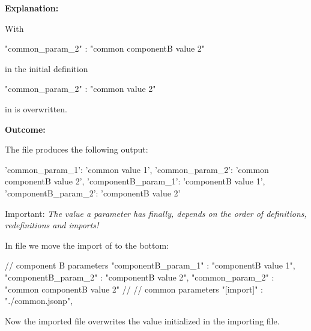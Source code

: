 \newpage

\textbf{Explanation:}

\vspace{2ex}

With

\begin{pythoncode}
   "common_param_2" : "common componentB value 2"
\end{pythoncode}

in  the initial definition

\begin{pythoncode}
   "common_param_2" : "common value 2"
\end{pythoncode}

in  is overwritten.

\vspace{2ex}

\textbf{Outcome:}

\vspace{2ex}

The file  produces the following output:

\begin{pythonlog}
{'common_param_1': 'common value 1',
 'common_param_2': 'common componentB value 2',
 'componentB_param_1': 'componentB value 1',
 'componentB_param_2': 'componentB value 2'}
\end{pythonlog}

\vspace{2ex}

Important: \textit{The value a parameter has finally, depends on the order of definitions, redefinitions and imports!}

\vspace{2ex}

In file  we move the import of  to the bottom:

\begin{pythoncode}[linebackgroundcolor=\hlcode{8}]
{
   // component B parameters
   "componentB_param_1" : "componentB value 1",
   "componentB_param_2" : "componentB value 2",
   "common_param_2" : "common componentB value 2"
   //
   // common parameters
   "[import]" : "./common.jsonp",
}
\end{pythoncode}

Now the imported file overwrites the value initialized in the importing file.

\vspace{2ex}

